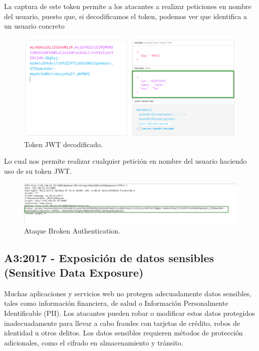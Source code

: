 La captura de este token permite a los atacantes a realizar peticiones en nombre del usuario, puesto que, 
si decodificamos el token, podemos ver que identifica a un usuario concreto

\begin{figure}[!htb]
    \centering
    \captionsetup{width=1\linewidth}    
    \includegraphics[width=\linewidth]{./imagenes/014_BrokenAuthentication_2.png}
    \caption{Token JWT decodificado.}  
    \label{fig:Token JWT decodificado}
\end{figure}

\newpage
Lo cual nos permite realizar cualquier petición en nombre del usuario haciendo uso de su token JWT.

\begin{figure}[!htb] 
    \centering
    \captionsetup{width=1\linewidth}   
    \includegraphics[width=\linewidth]{./imagenes/014_BrokenAuthentication_3.png}
    \caption{Ataque Broken Authentication.}  
    \label{fig:Broken Authentication attack}
\end{figure}

\subsection{A3:2017 - Exposición de datos sensibles (Sensitive Data Exposure)}

Muchas aplicaciones y servicios web no protegen adecuadamente datos sensibles, tales como
información financiera, de salud o Información Personalmente Identificable (PII). Los atacantes
pueden robar o modificar estos datos protegidos inadecuadamente para llevar a cabo fraudes
con tarjetas de crédito, robos de identidad u otros delitos. Los datos sensibles requieren métodos
de protección adicionales, como el cifrado en almacenamiento y tránsito. 

